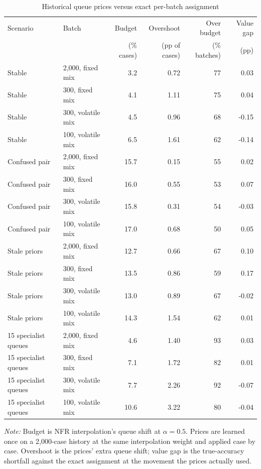 \begin{table}[H]
\centering
\caption{Historical queue prices versus exact per-batch assignment}
\label{tab:offsets}
\scriptsize
\begin{tabular}{llrrrr}
\toprule
Scenario & Batch & Budget & Overshoot & Over budget & Value gap \\
 & & (\% cases) & (pp of cases) & (\% batches) & (pp) \\
\midrule
Stable & 2,000, fixed mix & 3.2 & 0.72 & 77 & 0.03 \\
Stable & 300, fixed mix & 4.1 & 1.11 & 75 & 0.04 \\
Stable & 300, volatile mix & 4.5 & 0.96 & 68 & -0.15 \\
Stable & 100, volatile mix & 6.5 & 1.61 & 62 & -0.14 \\
Confused pair & 2,000, fixed mix & 15.7 & 0.15 & 55 & 0.02 \\
Confused pair & 300, fixed mix & 16.0 & 0.55 & 53 & 0.07 \\
Confused pair & 300, volatile mix & 15.8 & 0.31 & 54 & -0.03 \\
Confused pair & 100, volatile mix & 17.0 & 0.68 & 50 & 0.05 \\
Stale priors & 2,000, fixed mix & 12.7 & 0.66 & 67 & 0.10 \\
Stale priors & 300, fixed mix & 13.5 & 0.86 & 59 & 0.17 \\
Stale priors & 300, volatile mix & 13.0 & 0.89 & 67 & -0.02 \\
Stale priors & 100, volatile mix & 14.3 & 1.54 & 62 & 0.01 \\
15 specialist queues & 2,000, fixed mix & 4.6 & 1.40 & 93 & 0.03 \\
15 specialist queues & 300, fixed mix & 7.1 & 1.72 & 82 & 0.01 \\
15 specialist queues & 300, volatile mix & 7.7 & 2.26 & 92 & -0.07 \\
15 specialist queues & 100, volatile mix & 10.6 & 3.22 & 80 & -0.04 \\
\bottomrule
\end{tabular}
\begin{minipage}{0.96\linewidth}
\footnotesize\emph{Note:} Budget is NFR interpolation's queue shift at $\alpha=0.5$. Prices are learned once on a 2,000-case history at the same interpolation weight and applied case by case. Overshoot is the prices' extra queue shift; value gap is the true-accuracy shortfall against the exact assignment at the movement the prices actually used.
\end{minipage}
\end{table}

